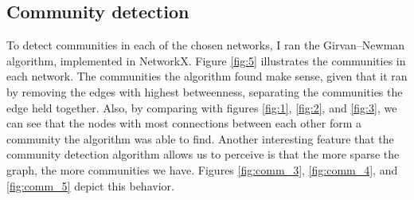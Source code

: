 \subsection{Community detection}
To detect communities in each of the chosen networks, I ran the Girvan--Newman algorithm, implemented in NetworkX. Figure \ref{fig:5} illustrates the communities in each network. The communities the algorithm found make sense, given that it ran by removing the edges with highest betweenness, separating the communities the edge held together. Also, by comparing with figures \ref{fig:1}, \ref{fig:2}, and \ref{fig:3}, we can see that the nodes with most connections between each other form a community the algorithm was able to find. Another interesting feature that the community detection algorithm allows us to perceive is that the more sparse the graph, the more communities we have. Figures \ref{fig:comm_3}, \ref{fig:comm_4}, and \ref{fig:comm_5} depict this behavior.
